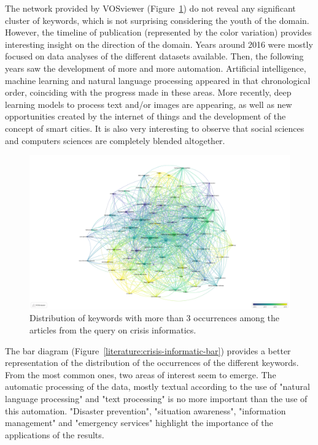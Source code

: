 The network provided by VOSviewer (Figure~\ref{literature:crisis-informatic-overlay}) do not reveal any significant cluster of keywords, which is not surprising considering the youth of the domain.
However, the timeline of publication (represented by the color variation) provides interesting insight on the direction of the domain.
Years around 2016 were mostly focused on data analyses of the different datasets available.
Then, the following years saw the development of more and more automation.
Artificial intelligence, machine learning and natural language processing appeared in that chronological order, coinciding with the progress made in these areas.
More recently, deep learning models to process text and/or images are appearing, as well as new opportunities created by the internet of things and the development of the concept of smart cities.
It is also very interesting to observe that social sciences and computers sciences are completely blended altogether.

\begin{landscape}
    \begin{figure}[htb]
        \includegraphics[width=\paperwidth,height=\paperheight,keepaspectratio]{figures/chap-2/crisis-informatic-overlay.pdf}
        \caption{Distribution of keywords with more than 3 occurrences among the articles from the query on crisis informatics. }
        \label{literature:crisis-informatic-overlay}
    \end{figure}
\end{landscape}

The bar diagram (Figure~\ref{literature:crisis-informatic-bar}) provides a better representation of the distribution of the occurrences of the different keywords.
From the most common ones, two areas of interest seem to emerge.
The automatic processing of the data, mostly textual according to the use of "natural language processing" and "text processing" is no more important than the use of this automation.
"Disaster prevention", "situation awareness", "information management" and "emergency services" highlight the importance of the applications of the results.

